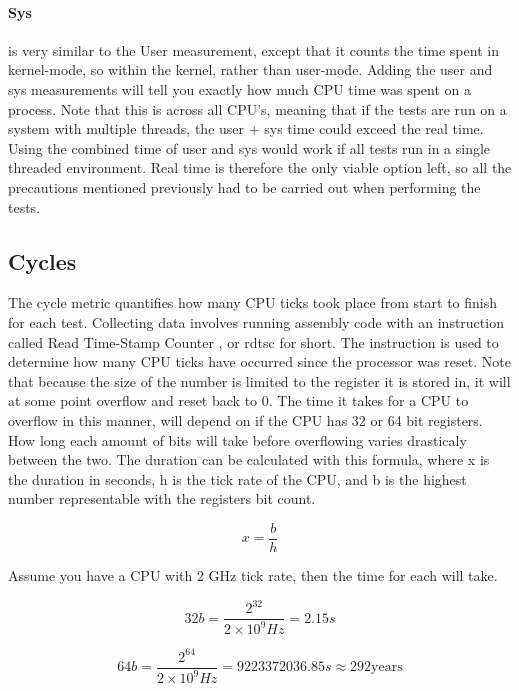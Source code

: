 \paragraph{Sys}is very similar to the User measurement, except that it counts the time spent in kernel-mode, so within the kernel, rather than user-mode.
Adding the user and sys measurements will tell you exactly how much CPU time was spent on a process.
Note that this is across all CPU's, meaning that if the tests are run on a system with multiple threads, the user + sys time could exceed the real time.
Using the combined time of user and sys would work if all tests run in a single threaded environment.
Real time is therefore the only viable option left, so all the precautions mentioned previously had to be carried out when performing the tests.

\subsection{Cycles}
The cycle metric quantifies how many CPU ticks took place from start to finish for each test.
Collecting data involves running assembly code with an instruction called Read Time-Stamp Counter 
, or rdtsc for short.
The instruction is used to determine how many CPU ticks have occurred since the processor was reset.
Note that because the size of the number is limited to the register it is stored in, it will at some point overflow and reset back to 0.
The time it takes for a CPU to overflow in this manner, will depend on if the CPU has 32 or 64 bit registers.
How long each amount of bits will take before overflowing varies drasticaly between the two.
The duration can be calculated with this formula, where x is the duration in seconds, h is the tick rate of the CPU, and b is the highest number representable with the registers bit count.

\begin{equation}
x = \frac{b}{h}
\end{equation}

\bigskip

Assume you have a CPU with 2 GHz tick rate, then the time for each will take.

\begin{equation}
32b = \frac{2^{32}}{2 \times 10^{9}Hz} = 2.15s
\end{equation}

\begin{equation}
64b = \frac{2^{64}}{2 \times 10^{9}Hz} = 9223372036.85s \approx 292 \text{years}
\end{equation}

